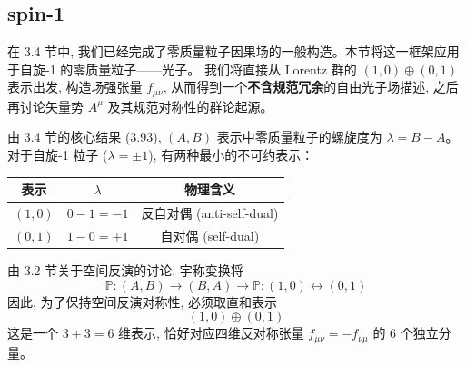 \subsection{spin-1}

在 3.4 节中, 我们已经完成了零质量粒子因果场的一般构造。本节将这一框架应用于自旋-1 的零质量粒子——光子。
我们将直接从 Lorentz 群的 $(1,0)\oplus(0,1)$ 表示出发, 构造场强张量 $f_{\mu\nu}$, 
从而得到一个\textbf{不含规范冗余}的自由光子场描述, 之后再讨论矢量势 $A^\mu$ 及其规范对称性的群论起源。

由 3.4 节的核心结果 (3.93), $(A,B)$ 表示中零质量粒子的螺旋度为 $\lambda = B - A$。
对于自旋-1 粒子 ($\lambda = \pm 1$), 有两种最小的不可约表示：

\begin{center}
\begin{tabular}{c c c}
\hline
表示 & $\lambda$ & 物理含义 \\
\hline
$(1,0)$ & $0-1=-1$ & 反自对偶 (anti-self-dual) \\
$(0,1)$ & $1-0=+1$ & 自对偶 (self-dual) \\
\hline
\end{tabular}
\end{center}
由 3.2 节关于空间反演的讨论, 宇称变换将 $$\mathbb{P}:(A,B) \to (B,A)\to\mathbb{P}: (1,0) \leftrightarrow (0,1)$$
因此, 为了保持空间反演对称性, 必须取直和表示
\begin{equation}
    (1,0) \oplus (0,1)
\end{equation}
这是一个 $3+3=6$ 维表示, 恰好对应四维反对称张量 $f_{\mu\nu} = -f_{\nu\mu}$ 的 6 个独立分量。


